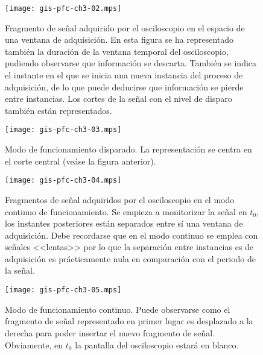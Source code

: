 \documentclass[a4paper,12pt]				{article}
\begin{document}
\begin{figure}
	\begin{center}
		\texttt{[image: gis-pfc-ch3-02.mps]}
	\end{center}
	\caption[Fragmento de señal adquirido por el osciloscopio en el
	espacio de una ventana de adquisición]{Fragmento de señal adquirido
	por el osciloscopio en el espacio de una ventana de adquisición. En
	esta figura se ha representado también la duración de la ventana
	temporal del osciloscopio, pudiendo observarse que información se
	descarta. También se indica el instante en el que se inicia una
	nueva instancia del proceso de adquisición, de lo que puede
	deducirse que información se pierde entre instancias. Los cortes de
	la señal con el nivel de disparo también están representados.}
	\label{fig:freesignal}
\end{figure}

\clearpage

\begin{figure}
	\begin{center}
		\texttt{[image: gis-pfc-ch3-03.mps]}
	\end{center}
	\caption[Modo de funcionamiento disparado]{Modo de funcionamiento
	disparado. La representación se centra en el corte central (veáse
	la figura anterior).}
	\label{fig:digtrigosc}
\end{figure}

\begin{figure}
	\begin{center}
		\texttt{[image: gis-pfc-ch3-04.mps]}
	\end{center}
	\caption[Fragmentos de señal ordenados según llegan al
	osciloscopio]{Fragmentos de señal adquiridos por el osciloscopio en
	el modo continuo de funcionamiento. Se empieza a monitorizar la
	señal en $t_0$, los instantes posteriores están separados entre sí
	una ventana de adquisición. Debe recordarse que en el modo continuo
	se emplea con señales <<lentas>> por lo que la separación entre
	instancias es de adquisición es prácticamente nula en comparación
	con el periodo de la señal.}
	\label{fig:freesignalcont}
\end{figure}

\begin{figure}
	\begin{center}
		\texttt{[image: gis-pfc-ch3-05.mps]}
	\end{center}
	\caption[Modo de funcionamiento continuo del osciloscopio]{Modo de
	funcionamiento continuo. Puede observarse como el fragmento de
	señal representado en primer lugar es desplazado a la derecha para
	poder insertar el nuevo fragmento de señal. Obviamente, en $t_0$ la
	pantalla del osciloscopio estará en blanco.}
	\label{fig:digcontosc}
\end{figure}
\end{document}
